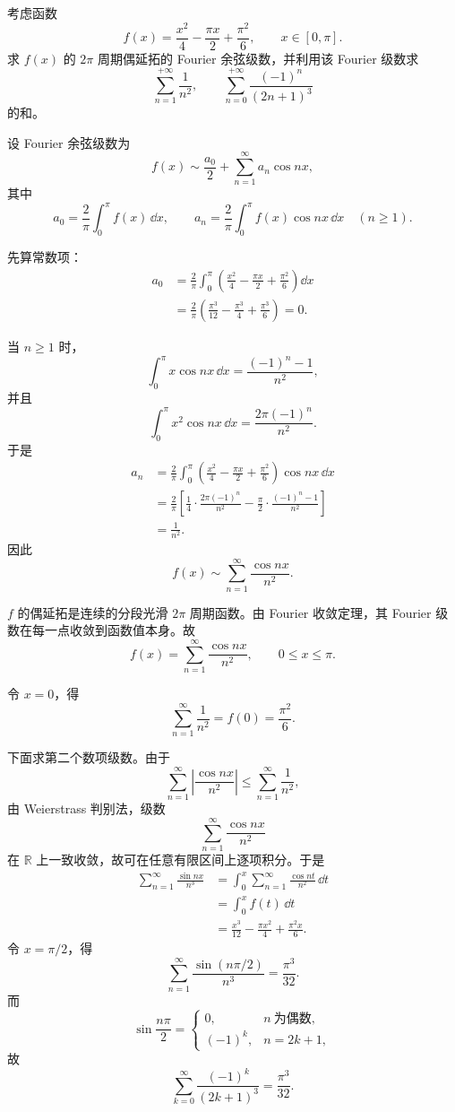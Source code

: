 \begin{question}[20分]
考虑函数
\[
  f(x)=\frac{x^2}{4}-\frac{\pi x}{2}+\frac{\pi^2}{6},
  \qquad x\in[0,\pi].
\]
求 $f(x)$ 的 $2\pi$ 周期偶延拓的 Fourier 余弦级数，并利用该 Fourier 级数求
\[
  \sum_{n=1}^{+\infty}\frac1{n^2},
  \qquad
  \sum_{n=0}^{+\infty}\frac{(-1)^n}{(2n+1)^3}
\]
的和。
\begin{solution}
设 Fourier 余弦级数为
\[
  f(x)\sim \frac{a_0}{2}+\sum_{n=1}^{\infty}a_n\cos nx,
\]
其中
\[
  a_0=\frac2\pi\int_0^\pi f(x)\,\dd{x},
  \qquad
  a_n=\frac2\pi\int_0^\pi f(x)\cos nx\,\dd{x}
  \quad(n\ge1).
\]

先算常数项：
\[
\begin{aligned}
  a_0
  &=\frac2\pi\int_0^\pi
  \left(\frac{x^2}{4}-\frac{\pi x}{2}+\frac{\pi^2}{6}\right)\dd{x}  \\
  &=\frac2\pi\left(\frac{\pi^3}{12}-\frac{\pi^3}{4}+\frac{\pi^3}{6}\right)=0.
\end{aligned}
\]

当 $n\ge1$ 时，
\[
  \int_0^\pi x\cos nx\,\dd{x}=\frac{(-1)^n-1}{n^2},
\]
并且
\[
  \int_0^\pi x^2\cos nx\,\dd{x}=\frac{2\pi(-1)^n}{n^2}.
\]
于是
\[
\begin{aligned}
  a_n
  &=\frac2\pi\int_0^\pi
  \left(\frac{x^2}{4}-\frac{\pi x}{2}+\frac{\pi^2}{6}\right)\cos nx\,\dd{x}  \\
  &=\frac2\pi\left[
    \frac14\cdot\frac{2\pi(-1)^n}{n^2}
    -\frac\pi2\cdot\frac{(-1)^n-1}{n^2}
  \right]  \\
  &=\frac1{n^2}.
\end{aligned}
\]
因此
\[
  f(x)\sim \sum_{n=1}^{\infty}\frac{\cos nx}{n^2}.
\]

$f$ 的偶延拓是连续的分段光滑 $2\pi$ 周期函数。由 Fourier 收敛定理，其 Fourier 级数在每一点收敛到函数值本身。故
\[
  f(x)=\sum_{n=1}^{\infty}\frac{\cos nx}{n^2},
  \qquad 0\le x\le\pi.
\]

令 $x=0$，得
\[
  \sum_{n=1}^{\infty}\frac1{n^2}
  =f(0)=\frac{\pi^2}{6}.
\]

下面求第二个数项级数。由于
\[
  \sum_{n=1}^{\infty}\left|\frac{\cos nx}{n^2}\right|
  \le
  \sum_{n=1}^{\infty}\frac1{n^2},
\]
由 Weierstrass 判别法，级数
\[
  \sum_{n=1}^{\infty}\frac{\cos nx}{n^2}
\]
在 $\mathbb R$ 上一致收敛，故可在任意有限区间上逐项积分。于是
\[
\begin{aligned}
  \sum_{n=1}^{\infty}\frac{\sin nx}{n^3}
  &=
  \int_0^x\sum_{n=1}^{\infty}\frac{\cos nt}{n^2}\,\dd{t}  \\
  &=
  \int_0^x f(t)\,\dd{t}  \\
  &=
  \frac{x^3}{12}-\frac{\pi x^2}{4}+\frac{\pi^2x}{6}.
\end{aligned}
\]
令 $x=\pi/2$，得
\[
  \sum_{n=1}^{\infty}\frac{\sin(n\pi/2)}{n^3}
  =\frac{\pi^3}{32}.
\]
而
\[
  \sin\frac{n\pi}{2}
  =
  \begin{cases}
    0, & n\ \text{为偶数},\\
    (-1)^k, & n=2k+1,
  \end{cases}
\]
故
\[
  \sum_{k=0}^{\infty}\frac{(-1)^k}{(2k+1)^3}
  =\frac{\pi^3}{32}.
\]


\end{solution}
\end{question}

